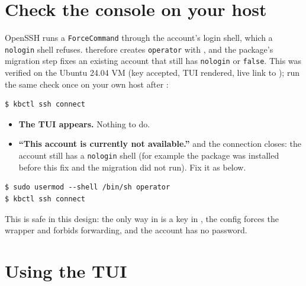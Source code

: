 \section{Check the console on your host}
\label{sec:nologin}
OpenSSH runs a \texttt{ForceCommand} through the account's login shell, which a \texttt{nologin} shell refuses.
 therefore creates \texttt{operator} with , and the package's migration step fixes an
existing account that still has \texttt{nologin} or \texttt{false}. This was verified on the Ubuntu 24.04 VM (key accepted, TUI rendered, live link to ); run the same check once on your own host after :
\resetsteps
{}
\begin{lstlisting}[style=console]
$ kbctl ssh connect
\end{lstlisting}
\begin{itemize}
\item \textbf{The TUI appears.} Nothing to do.
\item \textbf{``This account is currently not available.''} and the connection closes: the account still has a \texttt{nologin} shell (for example the package was installed before this fix and the migration did not run). Fix it as below.
\end{itemize}
\begin{lstlisting}[style=console]
$ sudo usermod --shell /bin/sh operator
$ kbctl ssh connect
\end{lstlisting}
This is safe in this design: the only way in is a key in , the config forces
the wrapper and forbids forwarding, and the account has no password.

\section{Using the TUI}
